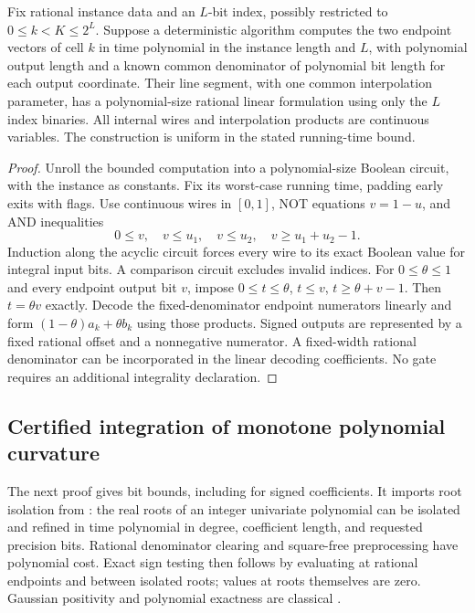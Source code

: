 \begin{lemma}\label{lem:indexed-compiler}
Fix rational instance data and an $L$-bit index, possibly restricted to
$0\le k<K\le2^L$. Suppose a deterministic algorithm computes the two
endpoint vectors of cell $k$ in time polynomial in the instance length
and $L$, with polynomial output length and a known common denominator
of polynomial bit length for each output coordinate. Their line segment,
with one common interpolation parameter, has a polynomial-size rational
linear
formulation using only the $L$ index binaries. All internal wires and
interpolation products are continuous variables. The construction is
uniform in the stated running-time bound.
\end{lemma}
\begin{proof}
Unroll the bounded computation into a polynomial-size Boolean circuit,
with the instance as constants. Fix its worst-case running time, padding
early exits with flags. Use continuous wires in $[0,1]$, NOT equations
$v=1-u$, and AND inequalities
\[
 0\le v,\quad v\le u_1,\quad v\le u_2,\quad v\ge u_1+u_2-1.
\]
Induction along the acyclic circuit forces every wire to its exact
Boolean value for integral input bits. A comparison circuit excludes
invalid indices. For $0\le\theta\le1$ and every endpoint output bit
$v$, impose $0\le t\le\theta$, $t\le v$, $t\ge\theta+v-1$.
Then $t=\theta v$ exactly. Decode the fixed-denominator endpoint
numerators linearly and form $(1-\theta)a_k+\theta b_k$ using those
products. Signed outputs are represented by a fixed rational offset
and a nonnegative numerator. A fixed-width rational denominator can
be incorporated in the linear decoding coefficients. No gate requires
an additional integrality declaration.
\end{proof}

\subsection{Certified integration of monotone polynomial curvature}

The next proof gives bit bounds, including for signed coefficients. It
imports root isolation from
\citet[Theorem 36 of the arXiv version]{sagraloff2015}: the real roots of
an integer univariate polynomial can be isolated and refined in time
polynomial in degree, coefficient length, and requested precision bits. Rational denominator clearing and
square-free preprocessing have polynomial cost. Exact sign testing
then follows by evaluating at rational endpoints and between isolated
roots; values at roots themselves are zero. Gaussian positivity and
polynomial exactness are classical \citep[Section 3.5(v)]{dlmfquadrature}.

